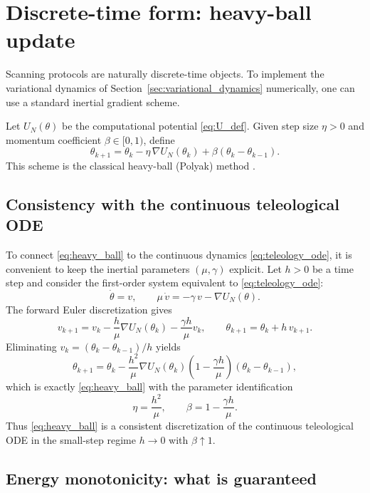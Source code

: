 
\section{Discrete-time form: heavy-ball update}
\label{app:discrete_time}

Scanning protocols are naturally discrete-time objects.
To implement the variational dynamics of Section~\ref{sec:variational_dynamics} numerically, one can use a standard inertial gradient scheme.

Let $U_N(\theta)$ be the computational potential \eqref{eq:U_def}.
Given step size $\eta>0$ and momentum coefficient $\beta\in[0,1)$, define
\begin{equation}
\label{eq:heavy_ball}
\theta_{k+1}=\theta_k-\eta\,\nabla U_N(\theta_k)+\beta(\theta_k-\theta_{k-1}).
\end{equation}
This scheme is the classical heavy-ball (Polyak) method \cite{Polyak1964}.

\subsection{Consistency with the continuous teleological ODE}
\label{app:discrete_consistency}

To connect \eqref{eq:heavy_ball} to the continuous dynamics \eqref{eq:teleology_ode}, it is convenient to keep the inertial parameters $(\mu,\gamma)$ explicit.
Let $h>0$ be a time step and consider the first-order system equivalent to \eqref{eq:teleology_ode}:
\[
\dot\theta=v,\qquad
\mu\,\dot v=-\gamma\,v-\nabla U_N(\theta).
\]
The forward Euler discretization gives
\[
v_{k+1}=v_k-\frac{h}{\mu}\nabla U_N(\theta_k)-\frac{\gamma h}{\mu}v_k,
\qquad
\theta_{k+1}=\theta_k+h\,v_{k+1}.
\]
Eliminating $v_k=(\theta_k-\theta_{k-1})/h$ yields
\[
\theta_{k+1}
=
\theta_k
-\frac{h^2}{\mu}\nabla U_N(\theta_k)
\left(1-\frac{\gamma h}{\mu}\right)(\theta_k-\theta_{k-1}),
\]
which is exactly \eqref{eq:heavy_ball} with the parameter identification
\[
\eta=\frac{h^2}{\mu},\qquad
\beta=1-\frac{\gamma h}{\mu}.
\]
Thus \eqref{eq:heavy_ball} is a consistent discretization of the continuous teleological ODE in the small-step regime $h\to 0$ with $\beta\uparrow 1$.

\subsection{Energy monotonicity: what is guaranteed}
\label{app:discrete_monotonicity}

